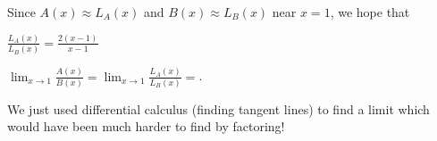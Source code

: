 \documentclass{ximera}
\begin{document}
\begin{question}
Since $A(x) \approx L_A(x)$  and $B(x) \approx L_B(x)$ near $x=1$, we hope that 
\begin{hint}
  $\frac{L_A(x)}{L_B(x)}  = \frac{2(x-1)}{x-1}$
\end{hint}
$\displaystyle \lim_{x \to 1} \frac{A(x)}{B(x)} = \displaystyle \lim_{x \to 1} \frac{L_A(x)}{L_B(x)}=$.
\end{question}

We just used differential calculus (finding tangent lines) to find a limit which would have been much harder to find
by factoring!
\end{document}
